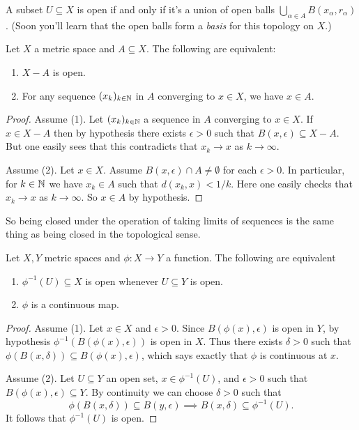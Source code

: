 \begin{exercise}
  \label{unionofballs}
  A subset $U \subseteq X$ is open if and only if it's a union of open
  balls $\bigcup_{\alpha \in A} B(x_\alpha, r_\alpha)$. (Soon you'll
  learn that the open balls form a \emph{basis} for this topology on
  $X$.)
\end{exercise}

\begin{proposition}
  Let $X$ a metric space and $A \subseteq X$. The following are
  equivalent:
  \begin{enumerate}
  \item $X - A$ is open.
  \item For any sequence $(x_k)_{k \in \mathbb{N}}$ in $A$ converging to $x
    \in X$, we have $x \in A$.
  \end{enumerate}
\end{proposition}

\begin{proof}
  Assume (1). Let $(x_k)_{k \in \mathbb{N}}$ a sequence in $A$ converging to
  $x \in X$. If $x \in X - A$ then by hypothesis there exists
  $\epsilon > 0$ such that $B(x, \epsilon) \subseteq X - A$. But one
  easily sees that this contradicts that $x_k \to x$ as $k \to
  \infty$.

  \medskip
  Assume (2). Let $x \in X$. Assume $B(x,\epsilon) \cap A \ne
  \emptyset$ for each $\epsilon > 0$. In particular, for $k \in \mathbb{N}$ we
  have $x_k \in A$ such that $d(x_k,x) < 1/k$. Here one easily checks
  that $x_k \to x$ as $k \to \infty$. So $x \in A$ by hypothesis.
\end{proof}

So being closed under the operation of taking limits of sequences is
the same thing as being closed in the topological sense.

\begin{proposition}
  Let $X, Y$ metric spaces and $\phi : X \to Y$ a function. The
  following are equivalent
  \begin{enumerate}
  \item $\phi^{-1}(U) \subseteq X$ is open whenever $U \subseteq Y$ is
    open.
  \item $\phi$ is a continuous map.
  \end{enumerate}
\end{proposition}

\begin{proof}
  Assume (1). Let $x \in X$ and $\epsilon > 0$. Since
  $B(\phi(x),\epsilon)$ is open in $Y$, by hypothesis
  $\phi^{-1}(B(\phi(x), \epsilon))$ is open in $X$. Thus there exists
  $\delta > 0$ such that $\phi(B(x, \delta)) \subseteq B(\phi(x),
  \epsilon)$, which says exactly that $\phi$ is continuous at $x$.

  \medskip
  Assume (2). Let $U \subseteq Y$ an open set, $x \in \phi^{-1}(U)$,
  and $\epsilon > 0$ such that $B(\phi(x),\epsilon) \subseteq Y$. By
  continuity we can choose $\delta > 0$ such that
  \[
  \phi(B(x,\delta)) \subseteq B(y,\epsilon) \implies B(x,\delta)
  \subseteq \phi^{-1}(U).
  \]
  It follows that $\phi^{-1}(U)$ is open.
\end{proof}

